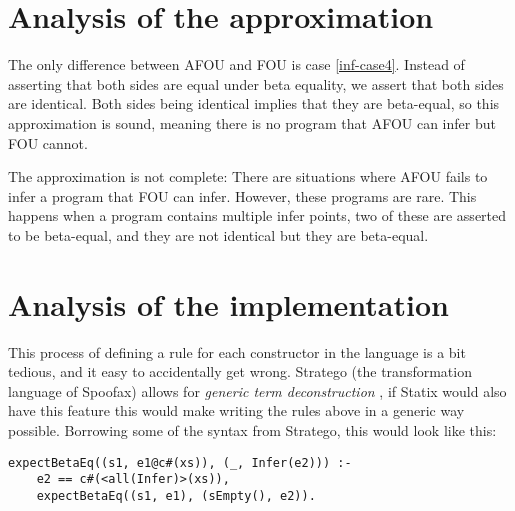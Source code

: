 \section{Analysis of the approximation}
\label{analysing-inference}

The only difference between AFOU and FOU is case \ref{inf-case4}. Instead of asserting that both sides are equal under beta equality, we assert that both sides are identical. Both sides being identical implies that they are beta-equal, so this approximation is sound, meaning there is no program that AFOU can infer but FOU cannot. 

The approximation is not complete: There are situations where AFOU fails to infer a program that FOU can infer. However, these programs are rare. This happens when a program contains multiple infer points, two of these are asserted to be beta-equal, and they are not identical but they are beta-equal. 

\section{Analysis of the implementation}
\label{analysing-inference-impl}

This process of defining a rule for each constructor in the language is a bit tedious, and it easy to accidentally get wrong. Stratego (the transformation language of Spoofax) allows for \emph{generic term deconstruction} \cite{generictermdestr}, if Statix would also have this feature this would make writing the rules above in a generic way possible. Borrowing some of the syntax from Stratego, this would look like this:

\begin{lstlisting}
expectBetaEq((s1, e1@c#(xs)), (_, Infer(e2))) :-
	e2 == c#(<all(Infer)>(xs)),
	expectBetaEq((s1, e1), (sEmpty(), e2)).
\end{lstlisting}



